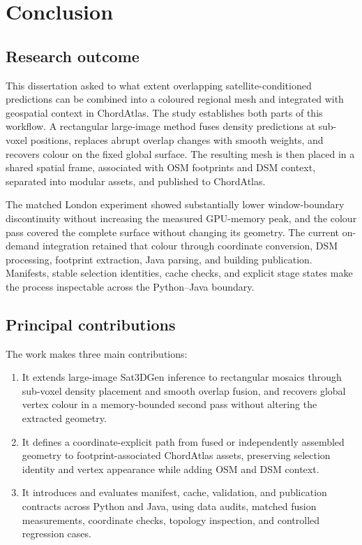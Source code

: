 \chapter{Conclusion} \label{Chap6}\label{chap:conclusion}

\section{Research outcome}

This dissertation asked to what extent overlapping satellite-conditioned
predictions can be combined into a coloured regional mesh and integrated with
geospatial context in ChordAtlas.  The study establishes both parts of this
workflow.  A rectangular large-image method fuses density predictions at
sub-voxel positions, replaces abrupt overlap changes with smooth weights, and
recovers colour on the fixed global surface.  The resulting mesh is then
placed in a shared spatial frame, associated with OSM footprints and DSM
context, separated into modular assets, and published to ChordAtlas.

The matched London experiment showed substantially lower window-boundary
discontinuity without increasing the measured GPU-memory peak, and the colour
pass covered the complete surface without changing its geometry.  The current
on-demand integration retained that colour through coordinate conversion, DSM
processing, footprint extraction, Java parsing, and building publication.
Manifests, stable selection identities, cache checks, and explicit stage states
make the process inspectable across the Python--Java boundary.

\section{Principal contributions}

The work makes three main contributions:

\begin{enumerate}
  \item It extends large-image Sat3DGen inference to rectangular mosaics through
  sub-voxel density placement and smooth overlap fusion, and recovers global
  vertex colour in a memory-bounded second pass without altering the extracted
  geometry.
  \item It defines a coordinate-explicit path from fused or independently
  assembled geometry to footprint-associated ChordAtlas assets, preserving
  selection identity and vertex appearance while adding OSM and DSM context.
  \item It introduces and evaluates manifest, cache, validation, and
  publication contracts across Python and Java, using data audits, matched
  fusion measurements, coordinate checks, topology inspection, and controlled
  regression cases.
\end{enumerate}


